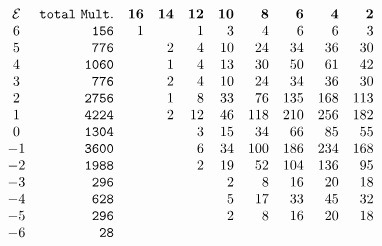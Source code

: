 \documentclass[a4paper,12pt]{article}
\begin{document}
\begin{equation}
\begin{array}{crrrrrrrrr}
{\cal E}&{\tt total\ Mult.}&{\bf 16}&{\bf14}&{\bf12}&{\bf10}&{\bf8}
&{\bf 6}&{\bf 4}&{\bf2}\\
6   & {\tt 156  }       &       1       &               &       1       &
3       &       4       &       6       &       6       &       3       \\
5       &       {\tt    776     }       &               &       2
&       4       &       10      &       24      &       34      &
36      &       30      \\
4       &       {\tt    1060    }       &               &       1
&       4       &       13      &       30      &       50      &
61      &       42      \\
3       &       {\tt    776     }       &               &       2
&       4       &       10      &       24      &       34      &
36      &       30      \\
2       &       {\tt    2756    }       &               &       1
&       8       &       33      &       76      &       135     &
168     &       113     \\
1       &       {\tt    4224    }       &               &       2
&       12      &       46      &       118     &       210     &
256     &       182     \\
0       &       {\tt1304        }       &               &
&       3       &       15      &       34      &       66      &
85      &       55      \\
-1      &       {\tt    3600    }       &               &
&       6       &       34      &       100     &       186     &
234     &       168     \\
-2      &       {\tt    1988    }       &               &
&       2       &       19      &       52      &       104     &
136     &       95      \\
-3      &       {\tt    296     }       &               &
&               &       2       &       8       &       16      &
20      &       18      \\
-4      &       {\tt    628     }       &               &
&               &       5       &       17      &       33      &
45      &       32      \\
-5      &       {\tt    296     }       &               &
&               &       2       &       8       &       16      &
20      &       18      \\
-6      &       {\tt    28      }       &               &               &

\end{array}
\end{equation}
\end{document}
